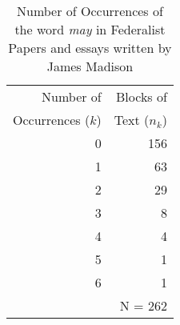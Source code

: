 \begin{table}[htb]
\caption[Occurrences of `may' in Federalist Papers]{Number of Occurrences of the word \emph{may} in Federalist Papers
and essays written by James Madison}
\label{tab:madison}
 \begin{center}
  \begin{tabular}{rr}
  \hline
Number of        & Blocks of \\
Occurrences ($k$)& Text ($n_k$)\\
  \hline
0 & 156 \\
1 & 63 \\
2 & 29 \\
3 & 8 \\
4 & 4 \\
5 & 1 \\
6 & 1 \\
  & N = 262 \\
  \hline
  \end{tabular}
 \end{center}
\end{table}
